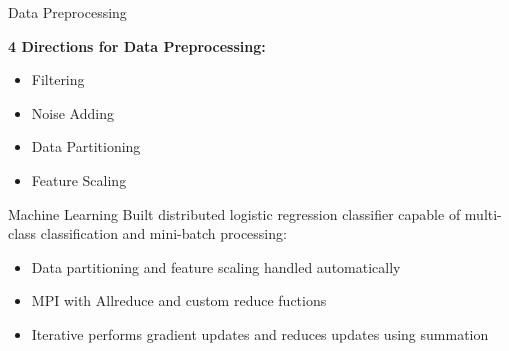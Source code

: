 \documentclass{beamer}
\begin{document}
\begin{frame}{Data Preprocessing}

\textbf{4 Directions for Data Preprocessing:}
\begin{itemize}
\item Filtering
\item Noise Adding
\item Data Partitioning
\item Feature Scaling
\end{itemize}

\end{frame}

\begin{frame}{Machine Learning}
Built distributed logistic regression classifier capable of multi-class classification and mini-batch processing:

\begin{itemize}
\item Data partitioning and feature scaling handled automatically
\item MPI with Allreduce and custom reduce fuctions
\item Iterative performs gradient updates and reduces updates using summation
\end{itemize}

\end{frame}
\end{document}
